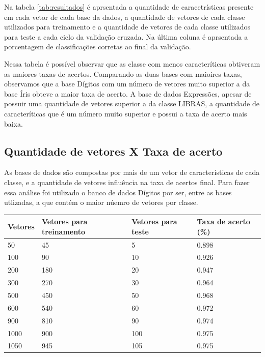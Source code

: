 Na tabela \ref{tab:resultados} é aprsentada a quantidade de caracetrísticas presente em cada vetor de cada base da dados, a quantidade de vetores de cada classe utilizados para treinamento e a quantidade de vetores de cada classe utilizados para teste a cada ciclo da validação cruzada. Na última coluna é aprsentada a porcentagem de classificações corretas ao final da validação.

Nessa tabela é possível observar que as classe com menos caracteríticas obtiveram as maiores taxas de acertos. Comparando as duas bases com maioires taxas, observamos que a base Dígitos com um número de vetores muito superior a da base Íris obteve a maior taxa de acerto. A base de dados Expressões, apesar de possuir uma quantidade de vetores superior a da classe LIBRAS, a quantidade de caracteríticas que é um número muito superior e possui a taxa de acerto mais baixa. 

\subsection{Quantidade de vetores X Taxa de acerto}
As bases de dados são compostas por mais de um vetor de características de cada classe, e a quantidade de vetores influência na taxa de acertos final. Para fazer essa análise foi utilizado o banco de dados Dígitos por ser, entre as bases utlizadas, a que contém o maior núemro de vetores por classe.

\begin{table}[h!]
	\begin{tabular}{|l|l|l|l|}
        \hline
	Vetores & Vetores para treinamento & Vetores para teste & Taxa de acerto (\%)\\ \hline
    	   50   & 	45		   &		5	& 	0.898\\ \hline
   	  100   & 	90		   &	       10	&	0.926\\ \hline
	  200   &      180   		   &	       20	&	0.947\\ \hline
    	  300 	&      270		   &	       30	&	0.964\\ \hline
    	  500 	&      450  		   & 	       50	&	0.968\\ \hline
    	  600 	&      540		   &	       60	&	0.972\\ \hline
    	  900 	&      810		   &	       90	&	0.974\\ \hline
    	 1000 	&      900		   &	      100	&	0.975\\ \hline
    	 1050 	&      945		   &	      105	&	0.975\\ \hline
	\end{tabular}
	\label{tab:vetorxtaxa}
\end{table}

